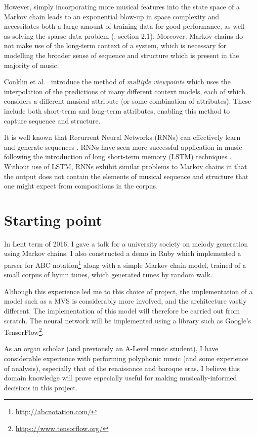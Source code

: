 \documentclass[12pt,a4paper,twoside]{article}
\begin{document}
However, simply incorporating more musical features into the state space of a
Markov chain leads to an exponential blow-up in space complexity and
necessitates both a large amount of training data for good performance, as well
as solving the sparse data problem (\cite{conklin2003music}, section 2.1).
Moreover, Markov chains do not make use of the long-term context of a system,
which is necessary for modelling the broader sense of sequence and structure
which is present in the majority of music.

Conklin et al.\ \cite{conklin1995viewpoints} introduce the method of
\emph{multiple viewpoints} which uses the interpolation of the predictions of
many different context models, each of which considers a different musical
attribute (or some combination of attributes). These include both short-term and
long-term attributes, enabling this method to capture sequence and structure.

It is well known that Recurrent Neural Networks (RNNs) can effectively learn and
generate sequences \cite{graves2013generating}. RNNs have seen more successful
application in music following the introduction of long short-term memory (LSTM)
techniques \cite{eck2002lstm}.  Without use of LSTM, RNNs exhibit similar
problems to Markov chains in that the output does not contain the elements of
musical sequence and structure that one might expect from compositions in the
corpus.

\section{Starting point}

In Lent term of 2016, I gave a talk for a university society on melody
generation using Markov chains. I also constructed a demo in Ruby which
implemented a parser for ABC notation\footnote{\url{http://abcnotation.com/}}
along with a simple Markov chain model, trained of a small corpus of hymn tunes,
which generated tunes by random walk. 

Although this experience led me to this choice of project, the implementation of
a model such as a MVS is considerably more involved, and
the architecture vastly different. The implementation of this model will
therefore be carried out from scratch.  The neural network will be implemented
using a library such as Google's
TensorFlow\footnote{\url{https://www.tensorflow.org/}}.

As an organ scholar (and previously an A-Level music student), I have
considerable experience with performing polyphonic music (and some experience of
analysis), especially that of the renaissance and baroque eras. I believe this
domain knowledge will prove especially useful for making musically-informed
decisions in this project. 
\end{document}
